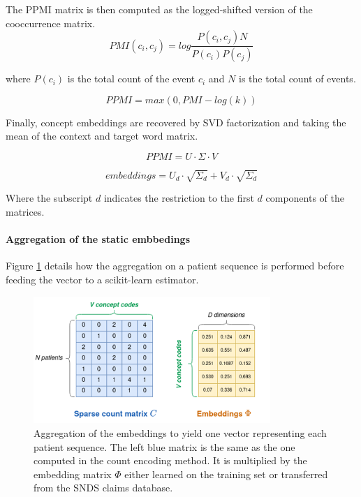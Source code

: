 \documentclass[french,12pt,twoside,a4paper]{book}
\begin{document}
\begin{appendices}
  The PPMI matrix is then computed as the logged-shifted version of the
  cooccurrence matrix.
  \begin{equation}\label{eq:pmi}
    PMI(c_i, c_j) = log\frac{P(c_i, c_j)N}{P(c_i)P(c_j)}
  \end{equation}

  where $P(c_i)$ is the total count of the event $c_i$ and $N$ is the total count of events.

  \begin{equation}\label{eq:ppmi}
    PPMI = max(0, PMI - log(k))
  \end{equation}

  Finally, concept embeddings are recovered by SVD factorization and taking the
  mean of the context and target word matrix.

  \begin{equation}
    PPMI = U \cdot \Sigma \cdot V
  \end{equation}

  \begin{equation}
    embeddings = U_d \cdot \sqrt{\Sigma_d} + V_d \cdot \sqrt{\Sigma_d}
  \end{equation}

  Where the subscript $d$ indicates the restriction to the first $d$ components of
  the matrices.

  \paragraph{Aggregation of the static embbedings}

  Figure \ref{apd:fig:pipelines:static_embeddings_aggregation} details how the aggregation on a
  patient sequence is performed before feeding the vector to a scikit-learn estimator.

  \begin{figure}
    \centering
    \includegraphics[width=0.8\textwidth]{img/chapter_3/static_embeddings_aggregation.png}
    \caption{Aggregation of the embeddings to yield one vector representing each
      patient sequence. The left blue matrix is the same as the one computed in
      the count encoding method. It is multiplied by the embedding matrix $\Phi$ either
      learned on the training set or transferred from the SNDS claims database.
    }\label{apd:fig:pipelines:static_embeddings_aggregation}
  \end{figure}


\end{appendices}
\end{document}
